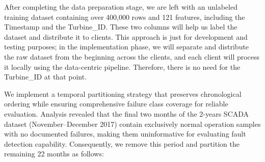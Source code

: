 \documentclass[12pt]{article}
\begin{document}
After completing the data preparation stage, we are left with an unlabeled training dataset containing over 400,000 rows and 121 features, including the Timestamp and the Turbine\_ID. These two columns will help us label the dataset and distribute it to clients. This approach is just for development and testing purposes; in the implementation phase, we will separate and distribute the raw dataset from the beginning across the clients, and each client will process it locally using the data-centric pipeline. Therefore, there is no need for the Turbine\_ID at that point. 


We implement a temporal partitioning strategy that preserves chronological ordering while ensuring comprehensive failure class coverage for reliable evaluation. Analysis revealed that the final two months of the 2-years SCADA dataset (November–December 2017) contain exclusively normal operation samples with no documented failures, making them uninformative for evaluating fault detection capability. Consequently, we remove this period and partition the remaining 22 months as follows:
\end{document}
